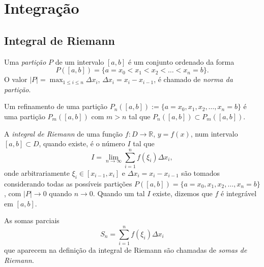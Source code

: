 

\chapter{Integração}\label{cap_integracao}
\thispagestyle{fancy}

\section{Integral de Riemann}\label{cap_integracao_sec_riemann}

\begin{defn}
  Uma \emph{partição} $P$ de um intervalo $[a, b]$ é um conjunto ordenado da forma
  \begin{equation}
    P([a, b]) = \{a=x_0 < x_1 < x_2 < \ldots < x_n=b\}.
  \end{equation}
O valor $|P| = \max_{1\leq i\leq n} \Delta x_i$, $\Delta x_i = x_i - x_{i-1}$, é chamado de \emph{norma da partição}.
\end{defn}

\begin{defn}
  Um refinamento de uma partição $P_n([a, b]) := \{a=x_0, x_1, x_2, \dotsc, x_n=b\}$ é uma partição $P_m([a, b])$ com $m>n$ tal que $P_n([a, b])\subset P_m([a, b])$.
\end{defn}

\begin{defn}
  A \emph{integral de Riemann} de uma função $f:D\to\mathbb{R}$, $y=f(x)$, num intervalo $[a, b]\subset D$, quando existe, é o número $I$ tal que
  \begin{equation}
     I = \lim_{n\to \infty} \sum_{i=1}^n f(\xi_i)\Delta x_i,
  \end{equation}
onde arbitrariamente $\xi_i\in [x_{i-1}, x_{i}]$ e $\Delta x_i = x_{i}-x_{i-1}$ são tomados considerando todas as possíveis partições $P([a, b]) = \{a=x_0, x_1, x_2, \dotsc, x_n=b\}$, com $|P|\to 0$ quando $n\to 0$. Quando um tal $I$ existe, dizemos que $f$ é integrável em $[a, b]$.
\end{defn}

\begin{obs}
  As somas parciais
  \begin{equation}
    S_n = \sum_{i=1}^n f(\xi_i)\Delta x_i
  \end{equation}
que aparecem na definição da integral de Riemann são chamadas de \emph{somas de Riemann}.
\end{obs}

